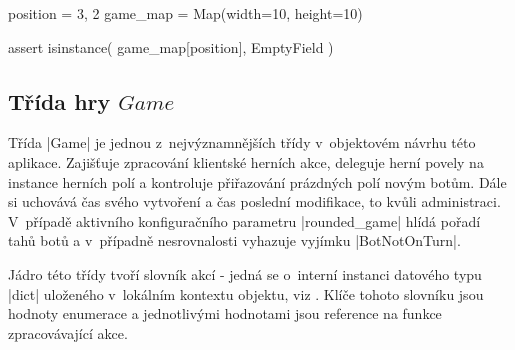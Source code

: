 \begin{code}[caption={Přetížené indexování třídy $Map$},label={lst:map-indexing}]
position = 3, 2
game_map = Map(width=10, height=10)

assert isinstance(
	game_map[position],
	EmptyField
)
\end{code}

\subsection{Třída hry $Game$}

Třída \ic|Game| je jednou z~nejvýznamnějších třídy v~objektovém návrhu této aplikace. Zajišťuje zpracování klientské herních akce, deleguje herní povely na instance herních polí a kontroluje přiřazování prázdných polí novým botům. Dále si uchovává čas svého vytvoření a čas poslední modifikace, to kvůli administraci. V~případě aktivního konfiguračního parametru \ic|rounded_game| hlídá pořadí tahů botů a v~případně nesrovnalosti vyhazuje vyjímku \ic|BotNotOnTurn|.

Jádro této třídy tvoří slovník akcí - jedná se o~interní instanci datového typu \ic|dict| uloženého v~lokálním kontextu objektu, viz . Klíče tohoto slovníku jsou hodnoty enumerace  a jednotlivými hodnotami jsou reference na funkce zpracovávající akce.
\\

